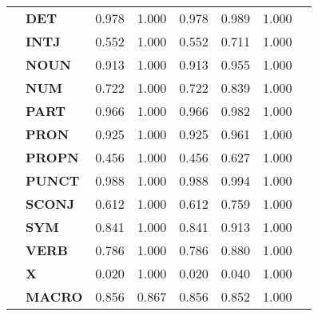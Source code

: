 \begin{longtable}{|l||l||l||l||l||l||l||l|}
\textbf{} & \textbf{DET} & 0.978 & 1.000 & 0.978 & 0.989 & 1.000 \\
\textbf{} & \textbf{INTJ} & 0.552 & 1.000 & 0.552 & 0.711 & 1.000 \\
\textbf{} & \textbf{NOUN} & 0.913 & 1.000 & 0.913 & 0.955 & 1.000 \\
\textbf{} & \textbf{NUM} & 0.722 & 1.000 & 0.722 & 0.839 & 1.000 \\
\textbf{} & \textbf{PART} & 0.966 & 1.000 & 0.966 & 0.982 & 1.000 \\
\textbf{} & \textbf{PRON} & 0.925 & 1.000 & 0.925 & 0.961 & 1.000 \\
\textbf{} & \textbf{PROPN} & 0.456 & 1.000 & 0.456 & 0.627 & 1.000 \\
\textbf{} & \textbf{PUNCT} & 0.988 & 1.000 & 0.988 & 0.994 & 1.000 \\
\textbf{} & \textbf{SCONJ} & 0.612 & 1.000 & 0.612 & 0.759 & 1.000 \\
\textbf{} & \textbf{SYM} & 0.841 & 1.000 & 0.841 & 0.913 & 1.000 \\
\textbf{} & \textbf{VERB} & 0.786 & 1.000 & 0.786 & 0.880 & 1.000 \\
\textbf{} & \textbf{X} & 0.020 & 1.000 & 0.020 & 0.040 & 1.000 \\
\textbf{} & \textbf{MACRO} & 0.856 & 0.867 & 0.856 & 0.852 & 1.000 \\
\cline{1-7}
\end{longtable}
